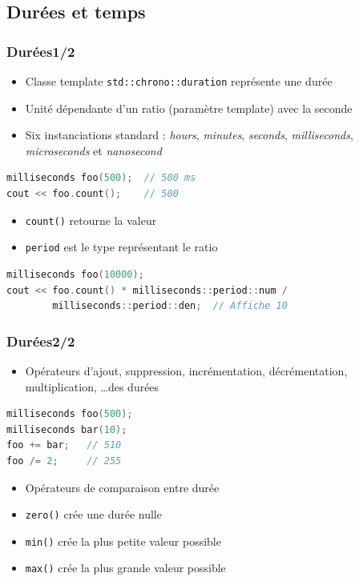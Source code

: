 \documentclass[C++.tex]{subfiles}
\begin{document}
\subsection*{Durées et temps}
\begin{frame}[fragile]
	\frametitle{Durées\titlehfill{}1/2}
	\begin{itemize}
		\item Classe template \lstinline|std::chrono::duration| représente une durée
		\item Unité dépendante d'un ratio (paramètre template) avec la seconde
		\item Six instanciations standard : \textit{hours}, \textit{minutes}, \textit{seconds}, \textit{milliseconds}, \textit{microseconds} et \textit{nanosecond}
	\end{itemize}

	\begin{lstlisting}[language=C++]
milliseconds foo(500);  // 500 ms
cout << foo.count();    // 500\end{lstlisting}

	\begin{itemize}
		\item \lstinline|count()| retourne la valeur
		\item \lstinline|period| est le type représentant le ratio
	\end{itemize}

	\begin{lstlisting}[language=C++]
milliseconds foo(10000);
cout << foo.count() * milliseconds::period::num / 
        milliseconds::period::den;  // Affiche 10\end{lstlisting}
\end{frame}

\begin{frame}[fragile]
	\frametitle{Durées\titlehfill{}2/2}
	\begin{itemize}
		\item Opérateurs d'ajout, suppression, incrémentation, décrémentation, multiplication, \ldots des durées
	\end{itemize}

	\begin{lstlisting}[language=C++]
milliseconds foo(500);
milliseconds bar(10);
foo += bar;   // 510
foo /= 2;     // 255\end{lstlisting}

	\begin{itemize}
		\item Opérateurs de comparaison entre durée
		\item \lstinline|zero()| crée une durée nulle
		\item \lstinline|min()| crée la plus petite valeur possible
		\item \lstinline|max()| crée la plus grande valeur possible
	\end{itemize}
\end{frame}
\end{document}
